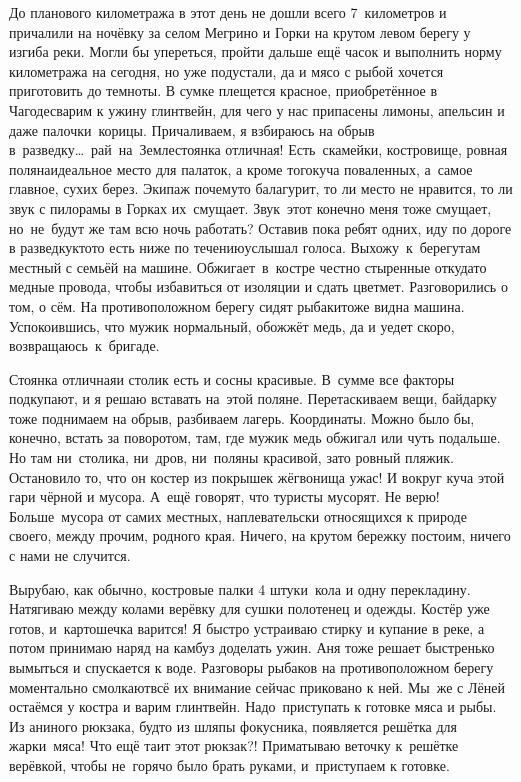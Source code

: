 До планового километража в этот день не дошли всего 7~километров и причалили на ночёвку за селом Мегрино и Горки на крутом левом берегу у изгиба реки. Могли бы упереться, пройти дальше ещё часок и выполнить норму километража на сегодня, но уже подустали, да и мясо с рыбой хочется приготовить до темноты. В сумке плещется красное, приобретённое в Чагоде\mdash сварим к ужину глинтвейн, для чего у нас припасены лимоны, апельсин и даже палочки~корицы. 
\newpage
Причаливаем, я взбираюсь на обрыв в~разведку\ldots~рай~на~Земле\mdash стоянка отличная! Есть~скамейки, костровище, ровная поляна\mdash идеальное место для палаток, а кроме того\mdash куча поваленных, а~самое главное, сухих берез. Экипаж почему\sdash то балагурит, то ли место не нравится, то ли звук с пилорамы в Горках их~смущает. Звук~этот конечно меня тоже смущает, но~не~будут же там всю ночь работать? Оставив пока ребят одних, иду по дороге в разведку\mdash кто\sdash то есть ниже по течению\mdash услышал голоса. Выхожу~к~берегу\mdash там местный с семьёй на машине. Обжигает~в~костре честно стыренные откуда\sdash то медные провода, чтобы избавиться от изоляции и сдать цветмет. Разговорились о том, о сём. На противоположном берегу сидят рыбаки\mdash тоже видна машина. Успокоившись, что мужик нормальный, обожжёт медь, да и уедет скоро, возвращаюсь~к~бригаде. 

Стоянка отличная\mdash и столик есть и сосны красивые. В~сумме все факторы подкупают, и я решаю вставать на~этой поляне. Перетаскиваем вещи, байдарку тоже поднимаем на обрыв, разбиваем лагерь. Координаты. Можно было бы, конечно, встать за поворотом, там, где мужик медь обжигал или чуть подальше. Но там ни~столика, ни~дров, ни~поляны красивой, зато ровный пляжик. Остановило то, что он костер из покрышек жёг\mdash вонища ужас! И вокруг куча этой гари чёрной и мусора. А~ещё говорят, что туристы мусорят. Не верю! Больше~мусора от самих местных, наплевательски относящихся к природе своего, между прочим, родного края. Ничего, на крутом бережку постоим, ничего с нами не случится.

Вырубаю, как обычно, костровые палки 4 штуки~кола и одну перекладину. Натягиваю между колами верёвку для сушки полотенец и одежды. Костёр уже готов, и~картошечка варится! Я быстро устраиваю стирку и купание в реке, а потом принимаю наряд на камбуз доделать ужин. Аня тоже решает быстренько вымыться и спускается к воде. Разговоры рыбаков на противоположном берегу моментально смолкают\mdash всё их внимание сейчас приковано к ней. Мы~же с Лёней остаёмся у костра и варим глинтвейн. Надо~приступать к готовке мяса и рыбы. Из аниного рюкзака, будто из шляпы фокусника, появляется решётка для жарки~мяса! Что ещё таит этот рюкзак?! Приматываю веточку к~решётке верёвкой, чтобы не~горячо было брать руками, и~приступаем к готовке. 

